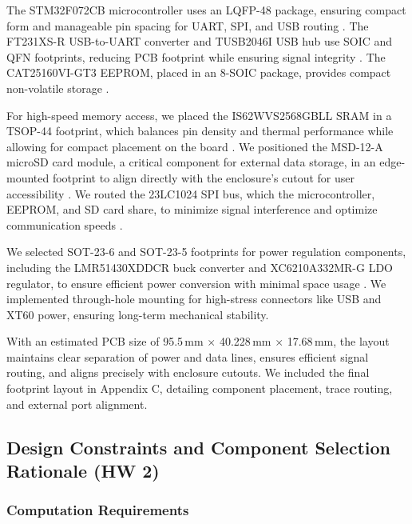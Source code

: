 \documentclass[12pt]{article}
\begin{document}
\par The STM32F072CB microcontroller uses an LQFP-48 package, ensuring compact form and manageable pin spacing for UART, SPI, and USB routing \cite{st2023stm32}. The FT231XS-R USB-to-UART converter and TUSB2046I USB hub use SOIC and QFN footprints, reducing PCB footprint while ensuring signal integrity \cite{ftdi2023ft231x} \cite{ti2023tusb}. The CAT25160VI-GT3 EEPROM, placed in an 8-SOIC package, provides compact non-volatile storage \cite{onsemi2023cat}.

\par For high-speed memory access, we placed the IS62WVS2568GBLL SRAM in a TSOP-44 footprint, which balances pin density and thermal performance while allowing for compact placement on the board \cite{issi2023sram}. We positioned the MSD-12-A microSD card module, a critical component for external data storage, in an edge-mounted footprint to align directly with the enclosure’s cutout for user accessibility \cite{samesky2023msd}. We routed the 23LC1024 SPI bus, which the microcontroller, EEPROM, and SD card share, to minimize signal interference and optimize communication speeds \cite{microchip2023sram}.

\par We selected SOT-23-6 and SOT-23-5 footprints for power regulation components, including the LMR51430XDDCR buck converter and XC6210A332MR-G LDO regulator, to ensure efficient power conversion with minimal space usage \cite{ti2023stepdown} \cite{torex2023ldo}. We implemented through-hole mounting for high-stress connectors like USB and XT60 power, ensuring long-term mechanical stability.

\par With an estimated PCB size of 95.5\,mm $\times$ 40.228\,mm $\times$ 17.68\,mm, the layout maintains clear separation of power and data lines, ensures efficient signal routing, and aligns precisely with enclosure cutouts. We included the final footprint layout in Appendix C, detailing component placement, trace routing, and external port alignment.

\subsection{Design Constraints and Component Selection Rationale (HW 2)}

\subsubsection{Computation Requirements}
\end{document}
